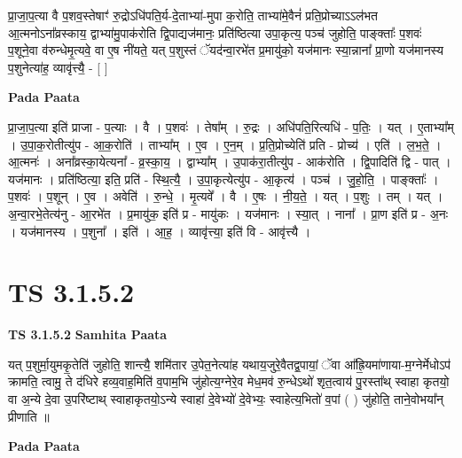 \documentclass[17pt]{extarticle}
\begin{document}
प्रा॒जा॒प॒त्या वै प॒शव॒स्तेषाꣳ॑ रु॒द्रोऽधि॑पति॒र्य-दे॒ताभ्या॑-मुपा क॒रोति॒ ताभ्या॑मे॒वैनं॑ प्रति॒प्रोच्याऽऽल॑भत आ॒त्मनोऽना᳚व्रस्काय॒ द्वाभ्या॑मु॒पाक॑रोति द्वि॒पाद्यज॑मानः॒ प्रति॑ष्ठित्या उपा॒कृत्य॒ पञ्च॑ जुहोति॒ पाङ्क्ताः᳚ प॒शवः॑ प॒शूने॒वा व॑रुन्धेमृ॒त्यवे॒ वा ए॒ष नी॑यते॒ यत् प॒शुस्तं ॅयद॑न्वा॒रभे॑त प्र॒मायु॑को॒ यज॑मानः स्या॒न्नाना᳚ प्रा॒णो यज॑मानस्य प॒शुनेत्या॑ह॒ व्यावृ॑त्त्यै॒ - [  ] \newline

\textbf{Pada Paata} \newline

प्रा॒जा॒प॒त्या इति॑ प्राजा - प॒त्याः । वै । प॒शवः॑ । तेषा᳚म् । रु॒द्रः । अधि॑पति॒रित्यधि॑ - प॒तिः॒ । यत् । ए॒ताभ्या᳚म् । उ॒पा॒क॒रोतीत्यु॑प - आ॒क॒रोति॑ । ताभ्या᳚म् । ए॒व । ए॒न॒म् । प्र॒ति॒प्रोच्येति॑ प्रति - प्रोच्य॑ । एति॑ । ल॒भ॒ते॒ । आ॒त्मनः॑ । अना᳚व्रस्का॒येत्यना᳚ - व्र॒स्का॒य॒ । द्वाभ्या᳚म् । उ॒पाक॑रा॒तीत्यु॑प - आक॑रोति । द्वि॒पादिति॑ द्वि - पात् । यज॑मानः । प्रति॑ष्ठित्या॒ इति॒ प्रति॑ - स्थि॒त्यै॒ । उ॒पा॒कृत्येत्यु॑प - आ॒कृत्य॑ । पञ्च॑ । जु॒हो॒ति॒ । पाङ्क्ताः᳚ । प॒शवः॑ । प॒शून् । ए॒व । अवेति॑ । रु॒न्धे॒ । मृ॒त्यवे᳚ । वै । ए॒षः । नी॒य॒ते॒ । यत् । प॒शुः । तम् । यत् । अ॒न्वा॒रभे॒तेत्य॑नु - आ॒रभे॑त । प्र॒मायु॑क॒ इति॑ प्र - मायु॑कः । यज॑मानः । स्या॒त् । नाना᳚ । प्रा॒ण इति॑ प्र - अ॒नः । यज॑मानस्य । प॒शुना᳚ । इति॑ । आ॒ह॒ । व्यावृ॑त्त्या॒ इति॑ वि - आवृ॑त्त्यै ।  \newline




\section*{ TS 3.1.5.2 }

\textbf{TS 3.1.5.2 } \newline
\textbf{Samhita Paata} \newline

यत् प॒शुर्मा॒युमकृ॒तेति॑ जुहोति॒ शान्त्यै॒ शमि॑तार उ॒पेत॒नेत्या॑ह यथाय॒जुरे॒वैतद्व॒पायां॒ ॅवा आ᳚ह्रि॒यमा॑णाया-म॒ग्नेर्मेधोऽप॑ क्रामति॒ त्वामु॒ ते द॑धिरे हव्य॒वाह॒मिति॑ व॒पाम॒भि जु॑होत्य॒ग्नेरे॒व मेध॒मव॑ रु॒न्धेऽथो॑ शृत॒त्वाय॑ पु॒रस्ता᳚थ् स्वाहा कृतयो॒ वा अ॒न्ये दे॒वा उ॒परि॑ष्टाथ् स्वाहाकृतयो॒ऽन्ये स्वाहा॑ दे॒वेभ्यो॑ दे॒वेभ्यः॒ स्वाहेत्य॒भितो॑ व॒पां ( ) जु॑होति॒ ताने॒वोभया᳚न् प्रीणाति ॥ \newline

\textbf{Pada Paata} \newline
\end{document}
